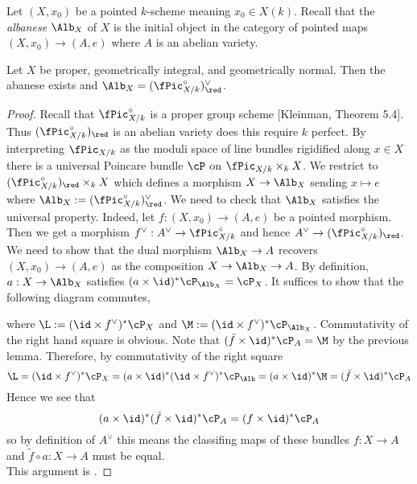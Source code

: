 \documentclass[12pt]{article}
\begin{document}
\begin{defn}
Let $(X, x_0)$ be a pointed $k$-scheme meaning $x_0 \in X(k)$. Recall that the \textit{albanese} $\Alb_X$ of $X$ is the initial object in the category of pointed maps $(X, x_0) \to (A, e)$ where $A$ is an abelian variety.
\end{defn}

\begin{theorem}
Let $X$ be proper, geometrically integral, and geometrically normal. Then the abanese exists and $\Alb_X = (\fPic_{X/k}^\circ)_{\red}^\vee$.
\end{theorem}

\begin{proof}
Recall that $\fPic_{X/k}^\circ$ is a proper group scheme [Kleinman, Theorem 5.4]. Thus $(\fPic^\circ_{X/k})_{\red}$ is an abelian variety {\color{red} does this require $k$ perfect}. By interpreting $\fPic_{X/k}$ as the moduli space of line bundles rigidified along $x \in X$ there is a universal Poincare bundle $\cP$ on $\fPic_{X/k} \times_k X$. We restrict to $(\fPic_{X/k}^\circ)_{\red} \times_k X$ which defines a morphism $X \to \Alb_X$ sending $x \mapsto e$ where $\Alb_X := (\fPic_{X/k}^\circ)_{\red}^\vee$. We need to check that $\Alb_X$ satisfies the universal property. Indeed, let $f : (X, x_0) \to (A, e)$ be a pointed morphism. Then we get a morphism $f^\vee : A^\vee \to \fPic_{X/k}^\circ$ and hence $A^\vee \to (\fPic_{X/k}^\circ)_{\red}$. We need to show that the dual morphism $\Alb_X \to A$ recovers $(X, x_0) \to (A, e)$ as the composition $X \to \Alb_X \to A$. By definition, $a : X \to \Alb_X$ satisfies $(a \times \id)^* \cP_{\Alb_X} = \cP_X$. It suffices to show that the following diagram commutes,
\begin{center}
\end{center}  
where $\L := (\id \times f^\vee)^* \cP_X$ and $\M := (\id \times f^\vee)^* \cP_{\Alb_X}$. Commutativity of the right hand square is obvious. Note that $(\tilde{f} \times \id)^* \cP_A = \M$ by the previous lemma. Therefore, by commutativity of the right square
\[ \L = (\id \times f^\vee)^* \cP_X = (a \times \id)^* (\id \times f^\vee)^* \cP_{\Alb} = (a \times \id)^* \M = (\tilde{f} \times \id)^* \cP_A \]
Hence we see that
\[ (a \times \id)^* (\tilde{f} \times \id)^* \cP_A = (f \times \id)^* \cP_A \]
so by definition of $A^\vee$ this means the classifing maps of these bundles $f : X \to A$ and $\tilde{f} \circ a : X \to A$ must be equal.
\bigskip\\
This argument is .
\end{proof}
\end{document}
